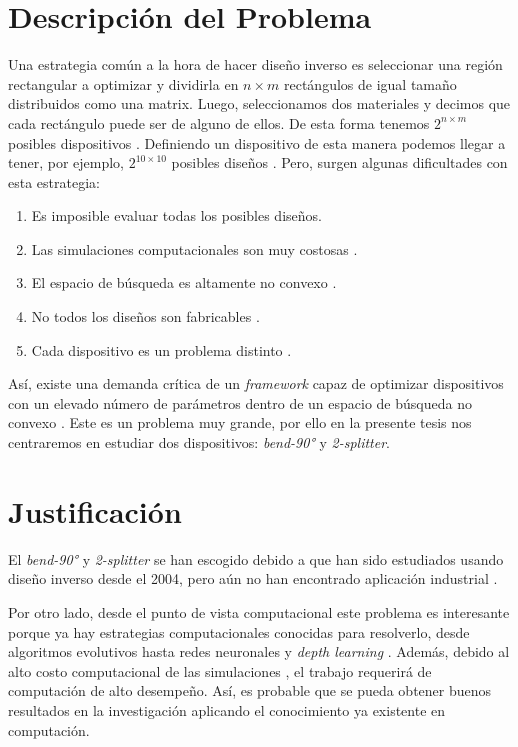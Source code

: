 \section{Descripción del  Problema}

Una estrategia común a la hora de hacer diseño inverso es seleccionar una región rectangular a optimizar y dividirla en $n \times m$ rectángulos
de igual tamaño distribuidos como una matrix. 
Luego, seleccionamos dos materiales y decimos que cada rectángulo puede ser de alguno de ellos. 
De esta forma tenemos $2^{n \times m}$ posibles dispositivos \cite{Su2020}. 
Definiendo un dispositivo de esta manera podemos llegar a tener, por ejemplo, $2^{10 \times 10}$ posibles diseños \cite{Malheiros-Silveira2020}.
Pero, surgen algunas dificultades con esta estrategia:

\begin{enumerate}
  \item Es imposible evaluar todas los posibles diseños.
  \item Las simulaciones computacionales son muy costosas \cite{Kudyshev2020}.
  \item El espacio de búsqueda es altamente no convexo \cite{Su2018}.
  \item No todos los diseños son fabricables \cite{Su2020}.
  \item Cada dispositivo es un problema distinto \cite{Molesky2018}.
\end{enumerate}


Así, existe una demanda crítica de un \emph{framework} capaz de optimizar dispositivos con un elevado número de parámetros dentro de un espacio de búsqueda no convexo \cite{Kudyshev2020}. Este es un problema muy grande, por ello en la presente tesis nos centraremos en estudiar dos dispositivos: \emph{bend-90°} y \emph{2-splitter}.


\section{Justificación}

El \emph{bend-90°} y \emph{2-splitter} se han escogido debido a que han sido estudiados usando diseño inverso desde el 2004, pero aún no han encontrado aplicación industrial \cite{Molesky2018}. 

Por otro lado, desde el punto de vista computacional este problema es interesante porque ya hay estrategias computacionales conocidas para resolverlo, desde algoritmos evolutivos \cite{Hansen2016} hasta redes neuronales \cite{Goodfellow2015} y \emph{depth learning} \cite{Malkiel2018}. 
Además, debido al alto costo computacional de las simulaciones \cite{Schneider2019}, el trabajo requerirá de computación de alto desempeño.
Así, es probable que se pueda obtener buenos resultados en la investigación aplicando el conocimiento ya existente en computación.

